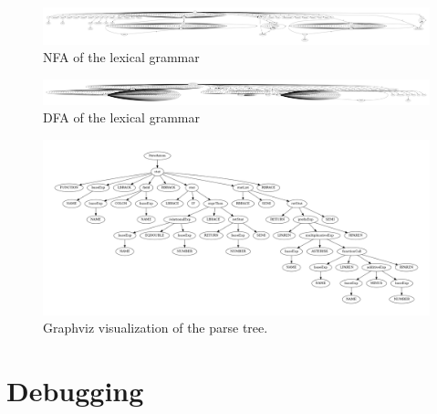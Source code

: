 \begin{figure}[t]
\includegraphics[width=\linewidth]{images/nfa.png}
\caption{NFA of the lexical grammar}
\label{fig:compiler}
\end{figure}

\begin{figure}[t]
\includegraphics[width=\linewidth]{images/dfa.png}
\caption{DFA of the lexical grammar}
\label{fig:compiler}
\end{figure}

\begin{figure}[t]
\includegraphics[width=\linewidth]{images/ptree.png}
\caption{Graphviz visualization of the parse tree.}
\label{fig:compiler}
\end{figure}

\section{Debugging} \label{debugging}
